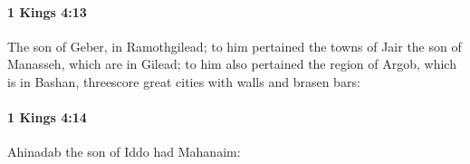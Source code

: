 		\paragraph{1 Kings 4:13} %
			\label{1KINGS-4-13}

			The son of Geber, in Ramothgilead; to him pertained the towns of Jair the son of Manasseh, which are in Gilead; to him also pertained the region of Argob, which is in Bashan, threescore great cities with walls and brasen bars:


		\paragraph{1 Kings 4:14} %
			\label{1KINGS-4-14}

			Ahinadab the son of Iddo had Mahanaim:


